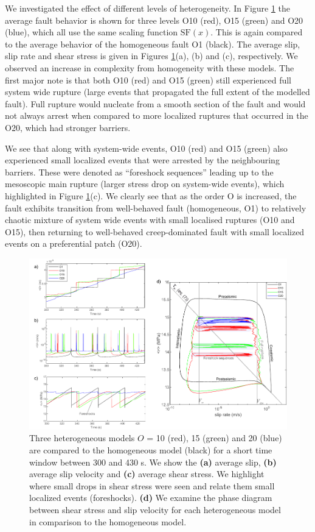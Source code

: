 \documentclass[preprint,1p, 10pt,authoryear]{elsarticle}
\begin{document}
We investigated the effect of different levels of heterogeneity. In Figure \ref{fig7} the average fault behavior is shown for three levels O10 (red), O15 (green) and O20 (blue), which all use the same scaling function $\mathrm{SF}(x)$.  This is again compared to the average behavior of the homogeneous fault O1 (black).  The average slip, slip rate and shear stress is given in Figures \ref{fig7}(a), (b) and (c), respectively.  We observed an increase in complexity from homogeneity with these models. The first major note is that both O10 (red) and O15 (green) still experienced full system wide rupture (large events that propagated the full extent of the modelled fault).  Full rupture would nucleate from a smooth section of the fault and would not always arrest when compared to more localized ruptures that occurred in the O20, which had stronger barriers. 

We see that along with system-wide events, O10 (red) and O15 (green) also experienced small localized events that were arrested by the neighbouring barriers. These were denoted as ``foreshock sequences'' leading up to the mesoscopic main rupture (larger stress drop on system-wide events), which highlighted in Figure \ref{fig7}(c). We clearly see that as the order O is increased, the fault exhibits transition from well-behaved fault (homogeneous, O1) to relatively chaotic mixture of system wide events with small localised ruptures (O10 and O15), then returning to well-behaved creep-dominated fault with small localized events on a preferential patch (O20).

\begin{figure}
	\centering
	\includegraphics{FIG7.pdf} 
	\caption{Three heterogeneous models $O$ =  10 (red), 15 (green) and 20 (blue) are compared to the homogeneous model (black) for a short time window between 300 and 430 s. We show the \textbf{(a)} average slip, \textbf{(b)} average slip velocity and \textbf{(c)} average shear stress.  We highlight where small drops in shear stress were seen and relate them small localized events (foreshocks). \textbf{(d)} We examine the phase diagram between shear stress and slip velocity for each heterogeneous model in comparison to the homogeneous model.}
	\label{fig7}
\end{figure} 
\end{document}

